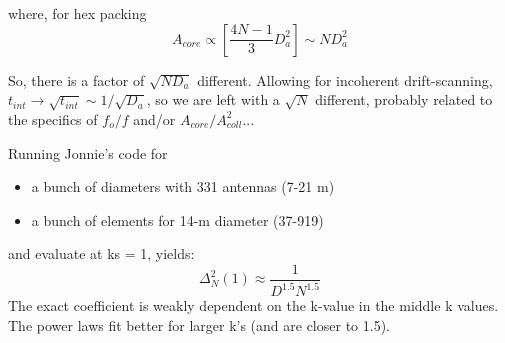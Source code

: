 \documentclass[11pt]{article}
\begin{document}
where, for hex packing
\begin{equation}
A_{core} \propto \left[\frac{4N-1}{3}D_a^2\right] \sim ND_a^2
\end{equation}

So, there is a factor of $\sqrt{ND_a}$ different.
Allowing for incoherent drift-scanning, $t_{int} \rightarrow \sqrt{t_{int}} \sim 1/ \sqrt{D_a}$, so we are left with a $\sqrt{N}$ different, probably related to the specifics of $f_o/f$ and/or $A_{core}/A_{coll}^2$...

Running Jonnie's code for 
\begin{itemize}
\item a bunch of diameters with 331 antennas (7-21 m)
\item a bunch of elements for 14-m diameter (37-919)
\end{itemize}
 and evaluate at ks = 1, yields:
\begin{equation}
\Delta^2_N(1) \approx \frac{1}{D^{1.5}N^{1.5}}
\end{equation}
The exact coefficient is weakly dependent on the k-value in the middle k values.  The power laws fit better for larger k's (and are closer to 1.5).
\end{document}
